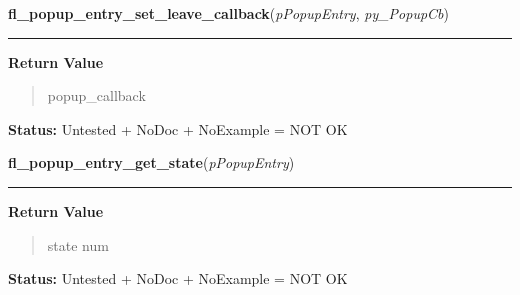     \vspace{0.5ex}

\hspace{.8\funcindent}\begin{boxedminipage}{\funcwidth}

    \raggedright \textbf{fl\_popup\_entry\_set\_leave\_callback}(\textit{pPopupEntry}, \textit{py\_PopupCb})

    \vspace{-1.5ex}

    \rule{\textwidth}{0.5\fboxrule}
\setlength{\parskip}{2ex}
\setlength{\parskip}{1ex}
      \textbf{Return Value}
    \vspace{-1ex}

      \begin{quote}
      popup\_callback

      \end{quote}

\textbf{Status:} Untested + NoDoc + NoExample = NOT OK



    \end{boxedminipage}

    \label{xformslib:library:fl_popup_entry_get_state}

    \vspace{0.5ex}

\hspace{.8\funcindent}\begin{boxedminipage}{\funcwidth}

    \raggedright \textbf{fl\_popup\_entry\_get\_state}(\textit{pPopupEntry})

    \vspace{-1.5ex}

    \rule{\textwidth}{0.5\fboxrule}
\setlength{\parskip}{2ex}
\setlength{\parskip}{1ex}
      \textbf{Return Value}
    \vspace{-1ex}

      \begin{quote}
      state num

      \end{quote}

\textbf{Status:} Untested + NoDoc + NoExample = NOT OK



    \end{boxedminipage}

